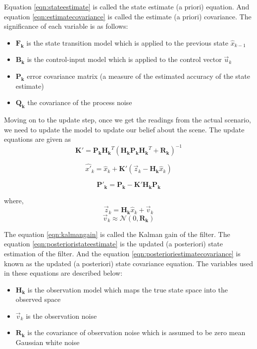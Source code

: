\documentclass[12pt,twocolumn,letterpaper]{article}
\begin{document}
Equation \ref{eqn:stateestimate} is called the state estimate (a priori) equation. And equation \ref{eqn:estimatecovariance} is called the estimate (a priori) covariance. The significance of each variable is as follows:
\begin{itemize}
\item $\mathbf{F_k}$ is the state transition model which is applied to the previous state $\hat{x}_{k−1}$
\item $\mathbf{B_k}$ is the control-input model which is applied to the control vector $\vec{u}_k$
\item $\mathbf{P_k}$ error covariance matrix (a measure of the estimated accuracy of the state estimate)
\item $\mathbf{Q_k}$ the covariance of the process noise
\end{itemize}

Moving on to the update step, once we get the readings from the actual scenario, we need to update the model to update our belief about the scene. The update equations are given as
\begin{equation}
\label{eqn:kalmangain}
\mathbf{K'} = \mathbf{P_k} \mathbf{H_k}^T \left( \mathbf{H_k} \mathbf{P_k} \mathbf{H_k}^T + \mathbf{R_k} \right)^{-1}
\end{equation}

\begin{equation}
\hat{x'}_k = \hat{x}_k + \mathbf{K'} \left( \vec{z}_k - \mathbf{H_k} \hat{x}_k \right)
\label{eqn:posterioristateestimate}
\end{equation}

\begin{equation}
\mathbf{P'_k} = \mathbf{P_k} - \mathbf{K'}  \mathbf{H_k} \mathbf{P_k}
\label{eqn:posterioriestimatecovariance}
\end{equation}

where,
$$ \vec{z}_k = \mathbf{H_k} \hat{x}_k + \vec{v}_k$$
$$ \vec{v}_k \approx \mathcal{N}(0, \mathbf{R_k})$$

The equation \ref{eqn:kalmangain} is called the Kalman gain of the filter. The equation \ref{eqn:posterioristateestimate} is the updated (a posteriori) state estimation of the filter. And the equation \ref{eqn:posterioriestimatecovariance} is known as the updated (a posteriori) state covariance equation. The variables used in these equations are described below:

\begin{itemize}
\item $\mathbf{H_k}$ is the observation model which maps the true state space into the observed space
\item $\vec{v}_k$ is the observation noise
\item $\mathbf{R_k}$ is the covariance of observation noise which is assumed to be zero mean Gaussian white noise
\end{itemize}
\end{document}
